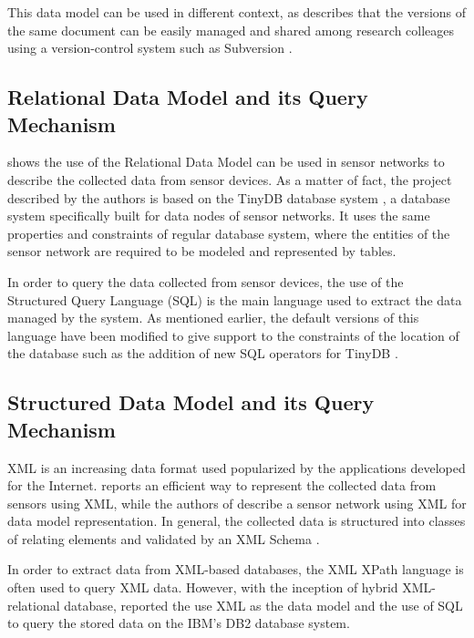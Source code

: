 This data model can be used in different context, as \cite{sn-provenance}
describes that the versions of the same document can be easily managed and
shared among research colleages using a version-control system such as
Subversion \cite{subversion}.

\subsection{Relational Data Model and its Query Mechanism}

\cite{sn-db-newop} shows the use of the Relational Data Model
\cite{relational-model} can be used in sensor networks to describe the
collected data from sensor devices. As a matter of fact, the project described
by the authors is based on the TinyDB database system \cite{sn-db-tinydb}, a
database system specifically built for data nodes of sensor networks. It uses
the same properties and constraints of regular database system, where the
entities of the sensor network are required to be modeled and represented by
tables.

In order to query the data collected from sensor devices, the use of the 
Structured Query Language (SQL) \cite{sql} is the main language used to extract
the data managed by the system. As mentioned earlier, the default versions of
this language have been modified to give support to the constraints of the
location of the database such as the addition of new SQL operators for TinyDB
\cite{sn-db-newop}.

\subsection{Structured Data Model and its Query Mechanism}

XML is an increasing data format used popularized by the applications developed
for the Internet. \cite{sn-xml-usage01} reports an efficient way to represent
the collected data from sensors using XML, while the authors of
\cite{sn-xml-usage02} describe a sensor network using XML for data model
representation. In general, the collected data is structured into classes of
relating elements and validated by an XML Schema \cite{xml-schema}.

In order to extract data from XML-based databases, the XML XPath language
\cite{xml-xpath} is often used to query XML data. However, with the inception
of hybrid XML-relational database, \cite{sn-xml-usage03} reported the use XML
as the data model and the use of SQL to query the stored data on the IBM's DB2
database system. 

